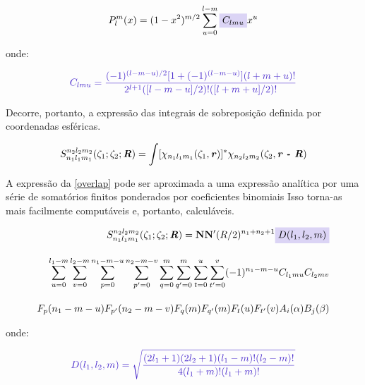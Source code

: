 \begin{equation}
\label{legendre}
    P^m_l(x) = (1 - x^2)^{m/2} \sum_{u=0}^{l - m} \highlight{blue}{$C_{lmu}$} x^u
\end{equation}

\noindent onde:

\begin{equation}
    \textcolor{blue!87}{C_{lmu} = \displaystyle \frac{(-1)^{(l-m-u)/2}[1 + (-1)^{(l - m - u)}](l + m + u)!}{2^{l + 1}([l - m - u]/2)!([l + m + u]/2)!}}
\end{equation}

Decorre, portanto, a expressão das integrais de sobreposição \autocite{Hoggan2011}
definida por coordenadas esféricas.

\begin{equation}
\label{overlap}
    S^{n_2 l_2 m_2}_{n_1 l_1 m_1} (\zeta_1; \zeta_2; \textbf{\textit{R}} ) = \int [\chi_{n_1 l_1 m_1} (\zeta_1, \textbf{\textit{r}})]^* \chi_{n_2 l_2 m_2} (\zeta_2, \textbf{\textit{r - R}})
\end{equation}

A expressão da \autoref{overlap} pode ser aproximada a uma expressão analítica por uma série de somatórios finitos ponderados por coeficientes binomiais Isso torna-as mais facilmente computáveis e, portanto, calculáveis.

\begin{figure}[htb]
\begin{equation}
\label{analitica}
\begin{split}
    S^{n_2 l_2 m_2}_{n_1 l_1 m_1} (\zeta_1; \zeta_2; \textbf{\textit{R}} ) = \mathbf{N} \mathbf{N'} (R/2)^{n_1 + n_2 + 1} \highlight{blue}{$D(l_1, l_2, m)$}  \\[0.35cm] \sum_{u=0}^{l_1 - m} \sum_{v=0}^{l_2 - m} \sum_{p=0}^{n_1 - m - u} \sum_{p'=0}^{n_2 - m - v} \sum_{q=0}^{m} \sum_{q'=0}^{m} \sum_{t=0}^{u}  \sum_{t'=0}^{v} (-1)^{n_1 - m - u} C_{l_1 m u} C_{l_2 m v} \\[0.35cm] F_p (n_1 - m - u) F_{p'} (n_2 - m - v)
    F_q (m) F_{q'} (m) F_t (u) F_{t'} (v) A_i (\alpha) B_j (\beta) 
\end{split}
\end{equation}
\end{figure}

\noindent onde:

\begin{equation}
    \textcolor{blue!87}{D(l_1, l_2, m) = \displaystyle \sqrt{\frac{(2l_1 + 1)(2l_2 + 1)(l_1 - m)!(l_2 - m)!}{4(l_1 + m)!(l_1 + m)!}}}
\end{equation}

